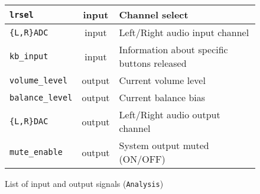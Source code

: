 \begin{figure}[h]
  \centering
  \caption{List of input and output signals (\texttt{Analysis})}
  \begin{tabular}{|l|c|l}
    \hline
    \verb+lrsel+ & input & Channel select \\    \hline
    \verb+{L,R}ADC+ & input & Left/Right audio input channel \\    \hline
    \verb+kb_input+ & input & Information about specific buttons released \\    \hline
    \verb+volume_level+ & output & Current volume level \\    \hline
    \verb+balance_level+ & output & Current balance bias \\    \hline
    \verb+{L,R}DAC+ & output & Left/Right audio output channel \\    \hline
    \verb+mute_enable+ & output & System output muted (ON/OFF) \\    \hline
  \end{tabular}
\end{figure}